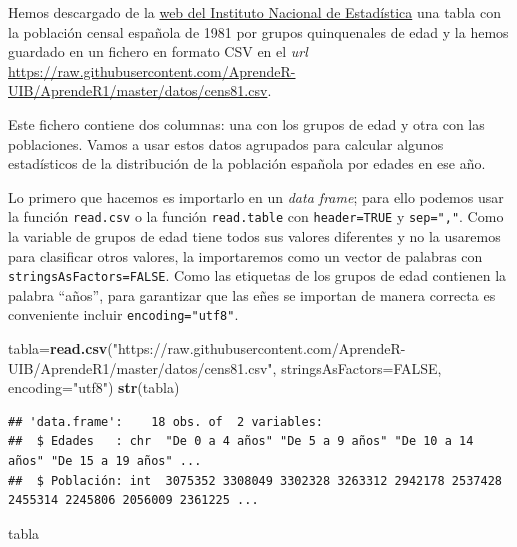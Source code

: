 \documentclass[]{book}
\newenvironment{Shaded}{\begin{snugshade}}{\end{snugshade}}
\newcommand{\DataTypeTok}[1]{\textcolor[rgb]{0.13,0.29,0.53}{#1}}
\newcommand{\KeywordTok}[1]{\textcolor[rgb]{0.13,0.29,0.53}{\textbf{#1}}}
\newcommand{\NormalTok}[1]{#1}
\newcommand{\OtherTok}[1]{\textcolor[rgb]{0.56,0.35,0.01}{#1}}
\newcommand{\StringTok}[1]{\textcolor[rgb]{0.31,0.60,0.02}{#1}}
\theoremstyle{definition}
\theoremstyle{definition}
\theoremstyle{definition}
\theoremstyle{remark}
\let\BeginKnitrBlock\begin \let\EndKnitrBlock\end
\begin{document}
\BeginKnitrBlock{example}
\protect\hypertarget{exm:demografia}{}{\label{exm:demografia} }Hemos descargado de la \href{http://www.ine.es/jaxi/tabla.do?path=/t20/e243/e01/a1981/l0/\&file=01006.px\&type=pcaxis\&L=0}{web del Instituto Nacional de Estadística} una tabla con la población censal española de 1981 por grupos quinquenales de edad y la hemos guardado en un fichero en formato CSV en el \emph{url} \url{https://raw.githubusercontent.com/AprendeR-UIB/AprendeR1/master/datos/cens81.csv}.
\EndKnitrBlock{example}

Este fichero contiene dos columnas: una con los grupos de edad y otra con las poblaciones.
Vamos a usar estos datos agrupados para calcular algunos estadísticos de la distribución de la población española por edades en ese año.

Lo primero que hacemos es importarlo en un \emph{data frame}; para ello podemos usar la función \texttt{read.csv} o la función \texttt{read.table} con \texttt{header=TRUE} y \texttt{sep=","}. Como la variable de grupos de edad tiene todos sus valores diferentes y no la usaremos para clasificar otros valores, la importaremos como un vector de palabras con
\texttt{stringsAsFactors=FALSE}. Como las etiquetas de los grupos de edad contienen la palabra ``años'', para garantizar que las eñes se importan de manera correcta es conveniente incluir \texttt{encoding="utf8"}.

\begin{Shaded}
\begin{Highlighting}[]
\NormalTok{tabla=}\KeywordTok{read.csv}\NormalTok{(}\StringTok{"https://raw.githubusercontent.com/AprendeR-UIB/AprendeR1/master/datos/cens81.csv"}\NormalTok{, }
               \DataTypeTok{stringsAsFactors=}\OtherTok{FALSE}\NormalTok{, }\DataTypeTok{encoding=}\StringTok{"utf8"}\NormalTok{)}
\KeywordTok{str}\NormalTok{(tabla)}
\end{Highlighting}
\end{Shaded}

\begin{verbatim}
## 'data.frame':    18 obs. of  2 variables:
##  $ Edades   : chr  "De 0 a 4 años" "De 5 a 9 años" "De 10 a 14 años" "De 15 a 19 años" ...
##  $ Población: int  3075352 3308049 3302328 3263312 2942178 2537428 2455314 2245806 2056009 2361225 ...
\end{verbatim}

\begin{Shaded}
\begin{Highlighting}[]
\NormalTok{tabla}
\end{Highlighting}
\end{Shaded}
\end{document}
